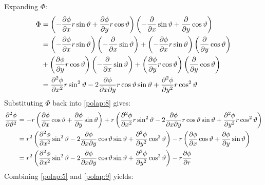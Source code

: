 \documentclass[a4paper,12pt]{article}
\renewcommand{\theta}{\vartheta}      		%
\newcommand{\partialder}[2]{\frac{\partial #1}{\partial #2}}        %
\begin{document}
Expanding $\Phi$:
\begin{align}
	\notag\Phi&=\left(-\partialder{\phi}{x}r\sin\theta+\partialder{\phi}{y}r\cos\theta\right)\left(-\partialder{}{x}\sin\theta+\partialder{}{y}\cos\theta\right)\\
	\notag&=\left(-\partialder{\phi}{x}r\sin\theta\right)\left(-\partialder{}{x}\sin\theta\right)+\left(-\partialder{\phi}{x}r\sin\theta\right)\left(\partialder{}{y}\cos\theta\right)\\
	\notag&+\left(\partialder{\phi}{y}r\cos\theta\right)\left(-\partialder{}{x}\sin\theta\right)+\left(\partialder{\phi}{y}r\cos\theta\right)\left(\partialder{}{y}\cos\theta\right)\\
	\notag&=\frac{\partial^2\phi}{\partial x^2}r\sin^2\theta-2\frac{\partial\phi}{\partial x\partial y}r\cos\theta\sin\theta+\frac{\partial^2\phi}{\partial y^2}r\cos^2\theta
\end{align}
Substituting $\Phi$ back into \ref{polap:8} gives:
\begin{align}
	\notag\frac{\partial^2\phi}{\partial\theta^2}&=-r\left(\partialder{\phi}{x}\cos\theta+\partialder{\phi}{y}\sin\theta\right)+r\left(\frac{\partial^2\phi}{\partial x^2}r\sin^2\theta-2\frac{\partial\phi}{\partial x\partial y}r\cos\theta\sin\theta+\frac{\partial^2\phi}{\partial y^2}r\cos^2\theta\right)\\
	\notag&=r^2\left(\frac{\partial^2\phi}{\partial x^2}\sin^2\theta-2\frac{\partial\phi}{\partial x\partial y}\cos\theta\sin\theta+\frac{\partial^2\phi}{\partial y^2}\cos^2\theta\right)-r\left(\partialder{\phi}{x}\cos\theta+\partialder{\phi}{y}\sin\theta\right)\\
	\label{polap:9}&=r^2\left(\frac{\partial^2\phi}{\partial x^2}\sin^2\theta-2\frac{\partial\phi}{\partial x\partial y}\cos\theta\sin\theta+\frac{\partial^2\phi}{\partial y^2}\cos^2\theta\right)-r\partialder{\phi}{r}
\end{align}
Combining \ref{polap:5} and \ref{polap:9} yields:
\end{document}
